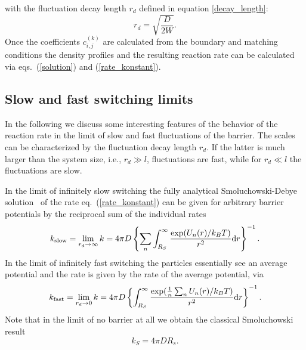 \documentclass[preprint,superscriptaddress]{revtex4-1}
\begin{document}
with the fluctuation decay length $r_d$ defined in equation \eqref{decay_length}:
\begin{equation}
    r_d = \sqrt{\frac{D}{2W}}.
    \label{rd_two_state}
\end{equation}
Once the coefficients $c^{(k)}_{i,j}$ are calculated from the boundary and matching conditions the density profiles and the resulting reaction rate can be calculated via
eqs.~(\ref{solution}) and (\ref{rate_konstant}).


\subsection{Slow and fast switching limits}

In the following we discuss some interesting features of the behavior of the reaction rate in the limit of slow and fast fluctuations 
of the barrier. The scales can be characterized by the fluctuation decay length $r_d$. If the latter is much larger than the system size, i.e.,  
$r_d\gg l $, fluctuations are fast, while for $r_d\ll l $ the fluctuations are slow.
 
In the limit of infinitely slow switching the fully analytical Smoluchowski-Debye solution~\cite{Debye1942} of the rate eq.~(\ref{rate_konstant}) can be 
 given for arbitrary barrier potentials by the reciprocal sum of the individual rates
\begin{equation}
    k _{\rm slow} = \lim_{r_d \to \infty} k  =4 \pi D \left\{\sum_n \int_{R_S}^\infty\frac{\exp(U_n(r)/k_BT)}{r^2}{\rm d}r\right\}^{-1}.
    \label{SD_rate_slow}
\end{equation}
In the limit of infinitely fast switching the particles essentially see an average potential and the rate is given by the rate 
of the average potential, via
\begin{equation}
    k _{\rm fast} = \lim_{r_d \to 0} k =   4 \pi D \left\{ \int_{R_S}^\infty\frac{\exp(\frac{1}{n}\sum_n U_n(r)/k_BT)}{r^2}{\rm d}r\right\}^{-1}.
    \label{SD_rate_fast}
\end{equation}
Note that in the limit of no barrier at all we obtain the classical Smoluchowski result~\cite{Smoluchowski1916, Smoluchowski1917a}
\begin{equation}
    k_S = 4 \pi D R_s.
    \label{S_rate}
\end{equation}
\end{document}
